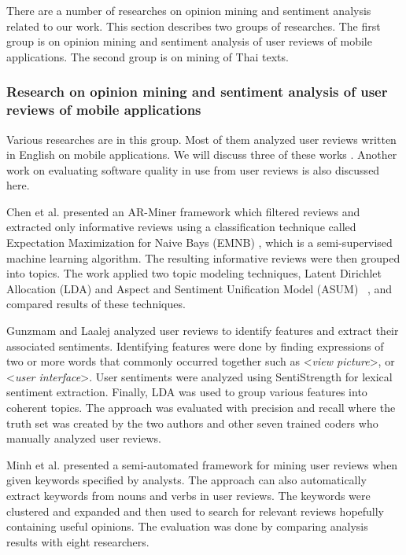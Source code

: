 There are a number of researches on opinion mining and sentiment analysis related to our work. This section describes two groups of researches. The first group is on opinion mining and sentiment analysis of user reviews of mobile applications. The second group is on mining of Thai texts. 

\subsubsection{Research on opinion mining and sentiment analysis of user reviews of mobile applications} Various researches are in this group. Most of them analyzed user reviews written in English on mobile applications. We will discuss three of these works \cite{ar-miner,userslikefeature,keywordmining}. Another work on evaluating software quality in use from user reviews \cite{leopairote2} is also discussed here.

Chen et al.\cite{ar-miner} presented an AR-Miner framework which filtered reviews and extracted only informative reviews using a classification technique called Expectation Maximization for Naive Bays (EMNB) \cite{EMNB}, which is a semi-supervised machine learning algorithm. The resulting informative reviews were then grouped into topics. The work applied two topic modeling techniques, Latent Dirichlet Allocation (LDA) \cite{LDA} and Aspect and Sentiment Unification Model (ASUM) ~\cite{asum}, and compared results of these techniques.

Gunzmam and Laalej \cite{userslikefeature} analyzed user reviews to identify features and extract their associated sentiments. Identifying features were done by finding expressions of two or more words that commonly occurred together such as <\textit{view picture}>, or <\textit{user interface}>. User sentiments were analyzed using SentiStrength \cite{SentiStrength} for lexical sentiment extraction. Finally, LDA was used to group various features into coherent topics. The approach was evaluated with precision and recall where the truth set was created by the two authors and other seven trained coders who manually analyzed user reviews. 

Minh et al. \cite{keywordmining} presented a semi-automated framework for mining user reviews when given keywords specified by analysts. The approach can also automatically extract keywords from nouns and verbs in user reviews. The keywords were clustered and expanded and then used to search for relevant reviews hopefully containing useful opinions. The evaluation was done by comparing analysis results with eight researchers.

